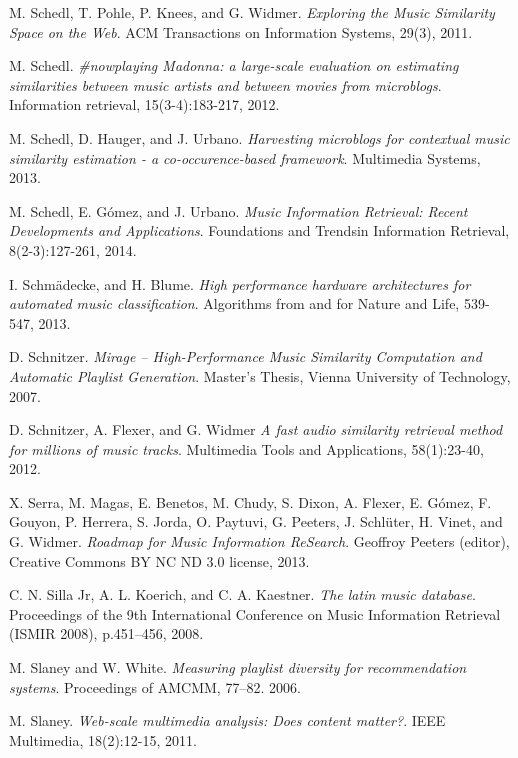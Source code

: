 \documentclass[11pt, oneside, openright]{Thesis} %
\begin{document}
\begin{thebibliography}{99}
M. Schedl, T. Pohle, P. Knees, and G. Widmer.
\textit{Exploring the Music Similarity Space on the Web}.
ACM Transactions on Information Systems, 29(3), 2011.

M. Schedl.
\textit{#nowplaying Madonna: a large-scale evaluation on estimating similarities between music artists and between movies from microblogs}.
Information retrieval, 15(3-4):183-217, 2012.

M. Schedl, D. Hauger, and J. Urbano.
\textit{Harvesting microblogs for contextual music similarity estimation - a co-occurence-based framework}.
Multimedia Systems, 2013.

M. Schedl, E. Gómez, and J. Urbano.
\textit{Music Information Retrieval: Recent Developments and Applications}. 
Foundations and Trends\textregistered in Information Retrieval, 8(2-3):127-261, 2014.

I. Schm\"{a}decke, and H. Blume.
\textit{High performance hardware architectures for automated music classification}.
Algorithms from and for Nature and Life, 539-547, 2013.

D. Schnitzer.
\textit{Mirage – High-Performance Music Similarity Computation and Automatic Playlist Generation}.
Master's Thesis, Vienna University of Technology, 2007.

D. Schnitzer, A. Flexer, and G. Widmer
\textit{A fast audio similarity retrieval method for millions of music tracks}.
Multimedia Tools and Applications, 58(1):23-40, 2012.

X. Serra, M. Magas, E. Benetos, M. Chudy, S. Dixon, A. Flexer, E. Gómez, F. Gouyon, P. Herrera, S. Jorda, O. Paytuvi, G. Peeters, J. Schlüter, H. Vinet, and G. Widmer.
\textit{Roadmap for Music Information ReSearch}. 
Geoffroy Peeters (editor), Creative Commons BY NC ND 3.0 license, 2013.

C. N. Silla Jr, A. L. Koerich, and C. A. Kaestner. 
\textit{The latin music database}.
Proceedings of the 9th International Conference on Music Information Retrieval (ISMIR 2008), p.451–456, 2008.

M. Slaney and W. White. 
\textit{Measuring playlist diversity for recommendation systems}. 
Proceedings of AMCMM, 77–82. 2006.

M. Slaney.
\textit{Web-scale multimedia analysis: Does content matter?}. 
IEEE Multimedia, 18(2):12-15, 2011.


\end{thebibliography}
\end{document}
